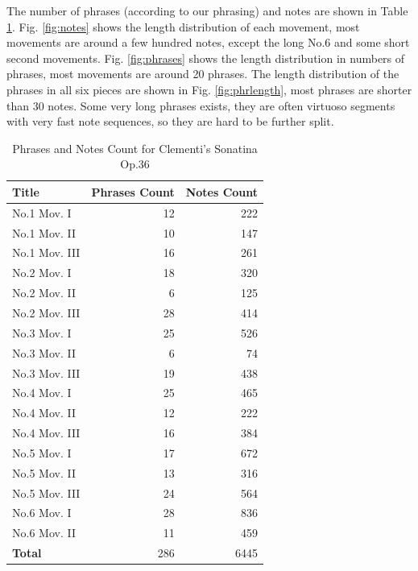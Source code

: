 The number of phrases (according to our phrasing) and notes are shown in Table \ref{tab:clemcount}. Fig. \ref{fig:notes} shows the length distribution of each movement, most movements are around a few hundred notes, except the long No.6 and some short second movements. Fig. \ref{fig:phrases} shows the length distribution in numbers of phrases, most movements are around 20 phrases. The length distribution of the phrases in all six pieces are shown in Fig. \ref{fig:phrlength}, most phrases are shorter than 30 notes. Some very long phrases exists, they are often virtuoso segments with very fast note sequences, so they are hard to be further split.

\begin{table}[bp]
   \centering
   \caption{Phrases and Notes Count for Clementi's Sonatina Op.36}
   \label{tab:clemcount}
   \begin{tabular}{lrr}
      \hline
      \textbf{Title}&\textbf{Phrases Count}&\textbf{Notes Count}\\
      \hline
      No.1 Mov. I&12&222\\
      No.1 Mov. II&10&147\\
      No.1 Mov. III&16&261\\
      No.2 Mov. I&18&320\\
      No.2 Mov. II&6&125\\
      No.2 Mov. III&28&414\\
      No.3 Mov. I&25&526\\
      No.3 Mov. II&6&74\\
      No.3 Mov. III&19&438\\
      No.4 Mov. I&25&465\\
      No.4 Mov. II&12&222\\
      No.4 Mov. III&16&384\\
      No.5 Mov. I&17&672\\
      No.5 Mov. II&13&316\\
      No.5 Mov. III&24&564\\
      No.6 Mov. I&28&836\\
      No.6 Mov. II&11&459\\
      \hline
      \textbf{Total} &286&6445\\
      \hline
   \end{tabular}
\end{table}


